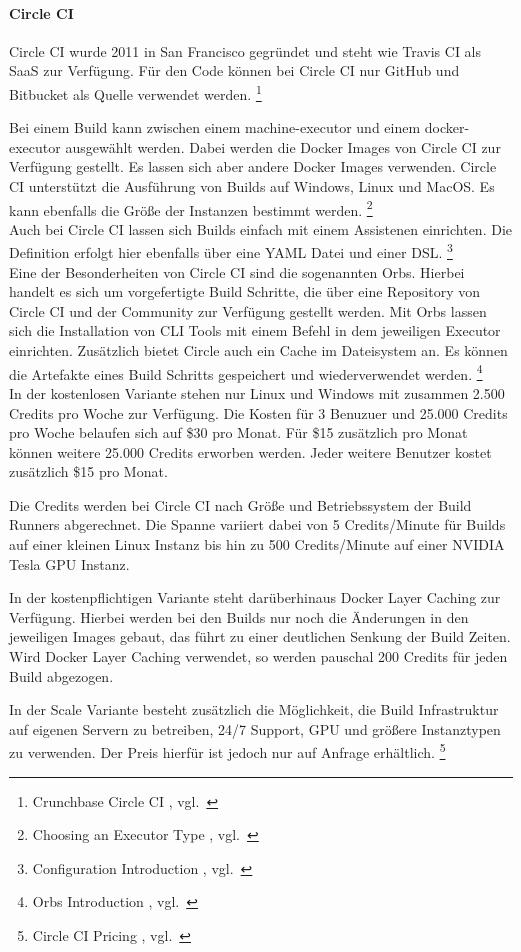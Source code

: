 \paragraph{Circle CI}\label{ci_services_tools_circle}

Circle CI wurde 2011 in San Francisco gegründet und steht wie Travis CI als SaaS zur Verfügung.
Für den Code können bei Circle CI nur GitHub und Bitbucket als Quelle verwendet werden. \footnote{Crunchbase Circle CI , vgl.~\cite{CRUNCHBASE_CIRCLE_CI}}

Bei einem Build kann zwischen einem machine-executor und einem docker-executor ausgewählt werden.
Dabei werden die Docker Images  von Circle CI zur Verfügung gestellt.
Es lassen sich aber andere Docker Images verwenden.
Circle CI unterstützt die Ausführung von Builds auf Windows, Linux und MacOS.
Es kann ebenfalls die Größe der Instanzen bestimmt werden. \footnote{Choosing an Executor Type , vgl.~\cite{CIRCLE_EXECUTORS}} \\

Auch bei Circle CI lassen sich Builds einfach mit einem Assistenen einrichten.
Die Definition erfolgt hier ebenfalls über eine YAML Datei und einer DSL. \footnote{Configuration Introduction , vgl.~\cite{CIRCLE_CONFIG}} \\

Eine der Besonderheiten von Circle CI sind die sogenannten Orbs.
Hierbei handelt es sich um vorgefertigte Build Schritte, die über eine Repository von Circle CI und der Community zur Verfügung gestellt werden.
Mit Orbs lassen sich die Installation von CLI Tools mit einem Befehl in dem jeweiligen Executor einrichten.
Zusätzlich bietet Circle auch ein Cache im Dateisystem an.
Es können die Artefakte eines Build Schritts gespeichert und wiederverwendet werden. \footnote{Orbs Introduction , vgl.~\cite{CIRCLE_ORBS}} \\

In der kostenlosen Variante stehen nur Linux und Windows mit zusammen 2.500 Credits pro Woche zur Verfügung.
Die Kosten für 3 Benuzuer und 25.000 Credits pro Woche belaufen sich auf \$30 pro Monat.
Für \$15 zusätzlich pro Monat können weitere 25.000 Credits erworben werden.
Jeder weitere Benutzer kostet zusätzlich \$15 pro Monat.

Die Credits werden bei Circle CI nach Größe und Betriebssystem der Build Runners abgerechnet.
Die Spanne variiert dabei von 5 Credits/Minute für Builds auf einer kleinen Linux Instanz
bis hin zu 500 Credits/Minute auf einer NVIDIA Tesla GPU Instanz.

In der kostenpflichtigen Variante steht darüberhinaus Docker Layer Caching zur Verfügung.
Hierbei werden bei den Builds nur noch die Änderungen in den jeweiligen Images gebaut, das führt zu einer deutlichen Senkung der Build Zeiten.
Wird Docker Layer Caching verwendet, so werden pauschal 200 Credits für jeden Build abgezogen.

In der Scale Variante besteht zusätzlich die Möglichkeit, die Build Infrastruktur auf eigenen Servern zu betreiben, 24/7 Support,
GPU und größere Instanztypen zu verwenden.
Der Preis hierfür ist jedoch nur auf Anfrage erhältlich. \footnote{Circle CI Pricing , vgl.~\cite{CIRCLE_PRICING}} \\

